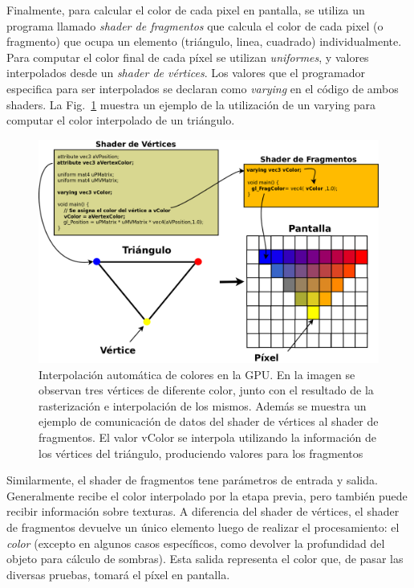 Finalmente, para calcular el color de cada pixel en pantalla, se utiliza un programa llamado \emph{shader de fragmentos} que calcula el color de cada pixel (o fragmento) que ocupa un elemento (triángulo, linea, cuadrado) individualmente.
Para computar el color final de cada píxel se utilizan \emph{uniformes}, y valores interpolados desde un \emph{shader de vértices}.
Los valores que el programador especifica para ser interpolados se declaran como \emph{varying} en el código de ambos shaders.
La Fig.~\ref{fg:interpolation} muestra un ejemplo de la utilización de un varying para computar el color interpolado de un triángulo.

\begin{figure}[h]
\begin{center}
\includegraphics[width=13cm]{figures/interpolation}
\end{center}
\caption[Interpolación automática de colores en la GPU.]{Interpolación automática de colores en la GPU. En la imagen se observan tres vértices de diferente color, junto con el resultado de la rasterización e interpolación de los mismos. Además se muestra un ejemplo de comunicación de datos del shader de vértices al shader de fragmentos. El valor vColor se interpola utilizando la información de los vértices del triángulo, produciendo valores para los fragmentos}
\label{fg:interpolation}
\end{figure}

Similarmente, el shader de fragmentos tene par\'ametros de entrada y salida.
Generalmente recibe el color interpolado por la etapa previa, pero tambi\'en puede recibir informaci\'on sobre texturas.
A diferencia del shader de vértices, el shader de fragmentos devuelve un único elemento luego de realizar el procesamiento: el {\em color} (excepto en algunos casos específicos, como devolver la profundidad del objeto para cálculo de sombras).
Esta salida representa el color que, de pasar las diversas pruebas, tomar\'a el p\'ixel en pantalla.

